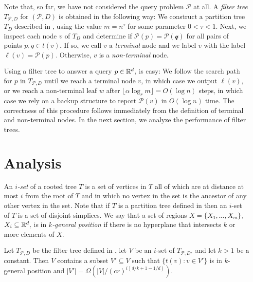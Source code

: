 \documentclass{patmorin}
\begin{document}
Note that, so far, we have not considered the query problem $\mathcal{P}$
at all. A \emph{filter tree} $T_{\mathcal{P},D}$ for $(\mathcal{P},D)$
is obtained in the following way:  We construct a partition tree $T_D$
described in , using the value $m=n^{\tau}$
for some parameter $0 < \tau < 1$.  Next, we inspect each node $v$ of
$T_D$ and determine if $\mathcal{P}(p)=\mathcal{P(q)}$ for all pairs
of points $p,q\in t(v)$. If so, we call $v$ a \emph{terminal} node and
we label $v$ with the label $\ell(v) = \mathcal{P}(p)$.  Otherwise, $v$
is a \emph{non-terminal} node.

Using a filter tree to answer a query $p\in \mathbb{R}^d$, is easy: We follow
the search path for $p$ in $T_{\mathcal{P},D}$ until we reach a terminal
node $v$, in which case we output $\ell(v)$, or we reach a non-terminal
leaf $w$ after $\lfloor \alpha\log_r m\rfloor=O(\log n)$ steps, in which
case we rely on a backup structure to report $\mathcal{P}(v)$ in $O(\log
n)$ time.  The correctness of this procedure follows immediately from
the definition of terminal and non-terminal nodes.  In the next section,
we analyze the performance of filter trees.



\section{Analysis}

An \emph{$i$-set} of a rooted tree $T$ is a set of vertices in $T$ all
of which are at distance at most $i$ from the root of $T$ and in which
no vertex in the set is the ancestor of any other vertex in the set.
Note that if $T$ is a partition tree defined in 
then an $i$-set of $T$ is a set of disjoint simplices.  We say that
a set of regions $X=\{X_1,\ldots,X_m\}$, $X_i\subseteq\mathbb{R}^d$, is in
\emph{$k$-general position} if there is no hyperplane that intersects $k$
or more elements of $X$.

\begin{lem}
  Let $T_{\mathcal{P},D}$ be the filter tree defined in
  , let $V$ be an $i$-set of $T_{\mathcal{P},D}$,
  and let $k>1$ be a constant.  Then $V$ contains a subset $V'\subseteq V$
  such that $\{t(v): v\in V'\}$ is in $k$-general position and
  $|V'|=\Omega(|V|/(cr)^{i(d/k+1-1/d)})$.
\end{lem}
\end{document}
